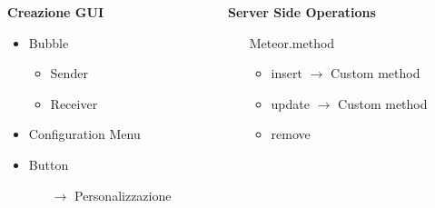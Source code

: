 \begin{frame}
  \begin{columns}[T] %
    \begin{column}{.48\textwidth}
      \textbf{Creazione GUI}
      \begin{itemize}
      \item Bubble
        \begin{itemize}
        \item Sender
        \item Receiver
        \end{itemize}
        \pause
      \item Configuration Menu
      \item Button
        \begin{itemize}\pause
        \item[$ \rightarrow $] Personalizzazione
        \end{itemize}
      \end{itemize}
    \end{column}
    \pause
    \begin{column}{.48\textwidth}
      \textbf{Server Side Operations}
      \begin{itemize}
      \item[] Meteor.method
        \begin{itemize}
        \item insert  $ \rightarrow $ Custom method
        \item update $ \rightarrow $ Custom method
        \item remove
        \end{itemize}
      \end{itemize}
    \end{column}

  \end{columns}

\end{frame}

